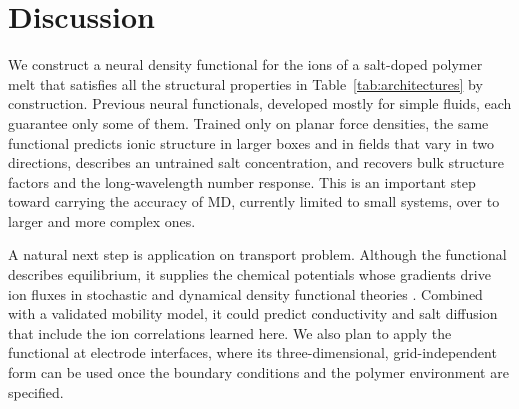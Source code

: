 \section*{Discussion}
We construct a neural density functional for the ions of a salt-doped polymer melt that satisfies all the structural properties in Table~\ref{tab:architectures} by construction. Previous neural functionals, developed mostly for simple fluids, each guarantee only some of them.
Trained only on planar force densities, the same functional predicts ionic structure in larger boxes and in fields that vary in two directions, describes an untrained salt concentration, and recovers bulk structure factors and the long-wavelength number response. This is an important step toward carrying the accuracy of MD, currently limited to small systems, over to larger and more complex ones.

A natural next step is application on transport problem. Although the functional describes equilibrium, it supplies the chemical potentials whose gradients drive ion fluxes in stochastic and dynamical density functional theories \cite{dean1996langevin,avni2022conductivity}. Combined with a validated mobility model, it could predict conductivity and salt diffusion that include the ion correlations learned here. We also plan to apply the functional at electrode interfaces, where its three-dimensional, grid-independent form can be used once the boundary conditions and the polymer environment are specified.